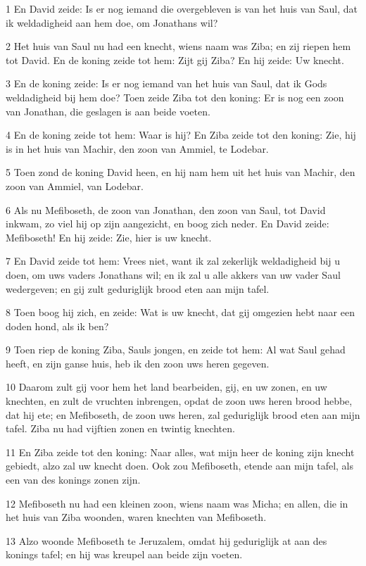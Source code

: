 \par 1 En David zeide: Is er nog iemand die overgebleven is van het huis van Saul, dat ik weldadigheid aan hem doe, om Jonathans wil?
\par 2 Het huis van Saul nu had een knecht, wiens naam was Ziba; en zij riepen hem tot David. En de koning zeide tot hem: Zijt gij Ziba? En hij zeide: Uw knecht.
\par 3 En de koning zeide: Is er nog iemand van het huis van Saul, dat ik Gods weldadigheid bij hem doe? Toen zeide Ziba tot den koning: Er is nog een zoon van Jonathan, die geslagen is aan beide voeten.
\par 4 En de koning zeide tot hem: Waar is hij? En Ziba zeide tot den koning: Zie, hij is in het huis van Machir, den zoon van Ammiel, te Lodebar.
\par 5 Toen zond de koning David heen, en hij nam hem uit het huis van Machir, den zoon van Ammiel, van Lodebar.
\par 6 Als nu Mefiboseth, de zoon van Jonathan, den zoon van Saul, tot David inkwam, zo viel hij op zijn aangezicht, en boog zich neder. En David zeide: Mefiboseth! En hij zeide: Zie, hier is uw knecht.
\par 7 En David zeide tot hem: Vrees niet, want ik zal zekerlijk weldadigheid bij u doen, om uws vaders Jonathans wil; en ik zal u alle akkers van uw vader Saul wedergeven; en gij zult geduriglijk brood eten aan mijn tafel.
\par 8 Toen boog hij zich, en zeide: Wat is uw knecht, dat gij omgezien hebt naar een doden hond, als ik ben?
\par 9 Toen riep de koning Ziba, Sauls jongen, en zeide tot hem: Al wat Saul gehad heeft, en zijn ganse huis, heb ik den zoon uws heren gegeven.
\par 10 Daarom zult gij voor hem het land bearbeiden, gij, en uw zonen, en uw knechten, en zult de vruchten inbrengen, opdat de zoon uws heren brood hebbe, dat hij ete; en Mefiboseth, de zoon uws heren, zal geduriglijk brood eten aan mijn tafel. Ziba nu had vijftien zonen en twintig knechten.
\par 11 En Ziba zeide tot den koning: Naar alles, wat mijn heer de koning zijn knecht gebiedt, alzo zal uw knecht doen. Ook zou Mefiboseth, etende aan mijn tafel, als een van des konings zonen zijn.
\par 12 Mefiboseth nu had een kleinen zoon, wiens naam was Micha; en allen, die in het huis van Ziba woonden, waren knechten van Mefiboseth.
\par 13 Alzo woonde Mefiboseth te Jeruzalem, omdat hij geduriglijk at aan des konings tafel; en hij was kreupel aan beide zijn voeten.

